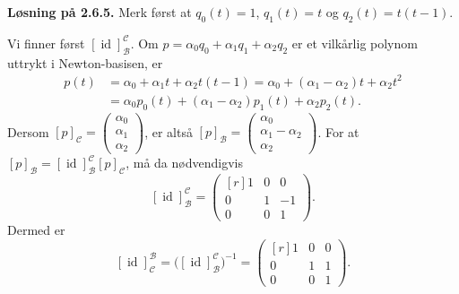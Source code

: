 \documentclass[a4paper,norsk]{article}
\DeclareMathOperator{\id}{id}
\newcommand{\basis}{{\mathcal{B}}}
\newcommand{\basiss}{{\mathcal{C}}}
\newenvironment{oppgave}[1]%
	{\trivlist{}\item\relax\textbf{Løsning på #1.}\medspace}%
	{\endtrivlist}
\begin{document}
\begin{oppgave}{2.6.5}
Merk først at $q_0(t)=1$, $q_1(t)=t$ og $q_2(t)=t(t-1)$.

Vi finner først $[\id]_\basis^\basiss$. Om $p=\alpha_0q_0+\alpha_1q_1+\alpha_2q_2$ er et vilkårlig polynom uttrykt i Newton-basisen, er
\begin{align*}
p(t) &= \alpha_0 + \alpha_1t+\alpha_2 t(t-1)
= \alpha_0 + (\alpha_1-\alpha_2)t + \alpha_2 t^2 \\
&= \alpha_0p_0(t) + (\alpha_1-\alpha_2)p_1(t) + \alpha_2 p_2(t).
\end{align*}
Dersom $[p]_\basiss = \begin{pmatrix}
\alpha_0 \\ \alpha_1 \\ \alpha_2
\end{pmatrix}$, er altså $[p]_\basis = \begin{pmatrix}
\alpha_0 \\ \alpha_1-\alpha_2 \\ \alpha_2
\end{pmatrix}$. For at $[p]_\basis = [\id]_\basis^\basiss[p]_\basiss$, må da nødvendigvis
\[
[\id]_\basis^\basiss = \begin{pmatrix*}[r]
1 & 0 & 0 \\ 0 & 1 & -1 \\ 0 & 0 & 1
\end{pmatrix*}.
\]
Dermed er
\[
[\id]_\basiss^\basis = \bigl([\id]_\basis^\basiss\bigr)^{-1}
= \begin{pmatrix*}[r]
1 & 0 & 0 \\ 0 & 1 & 1 \\ 0 & 0 & 1
\end{pmatrix*}.
\]
\end{oppgave}
\end{document}

